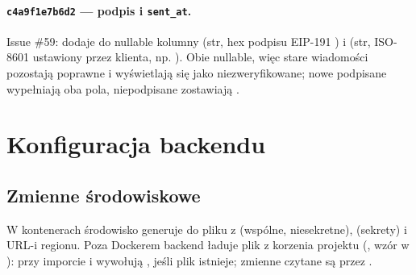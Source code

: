 \paragraph{\texttt{c4a9f1e7b6d2} --- podpis i \texttt{sent\_at}.} Issue \#59: dodaje do
 nullable kolumny  (str, hex podpisu EIP-191
) i  (str, ISO-8601 ustawiony przez klienta, np.
). Obie nullable, więc stare wiadomości pozostają poprawne i
wyświetlają się jako niezweryfikowane; nowe podpisane wypełniają oba pola, niepodpisane
zostawiają .

\section{Konfiguracja backendu}
\label{sec:dane-konfiguracja}

\subsection{Zmienne środowiskowe}
\label{sec:konf-env}

W kontenerach środowisko generuje  do pliku
 z  (wspólne, niesekretne),
 (sekrety) i URL-i regionu. Poza Dockerem backend ładuje plik
 z korzenia projektu (, wzór w ): przy
imporcie  i  wywołują , jeśli
plik istnieje; zmienne czytane są przez .

